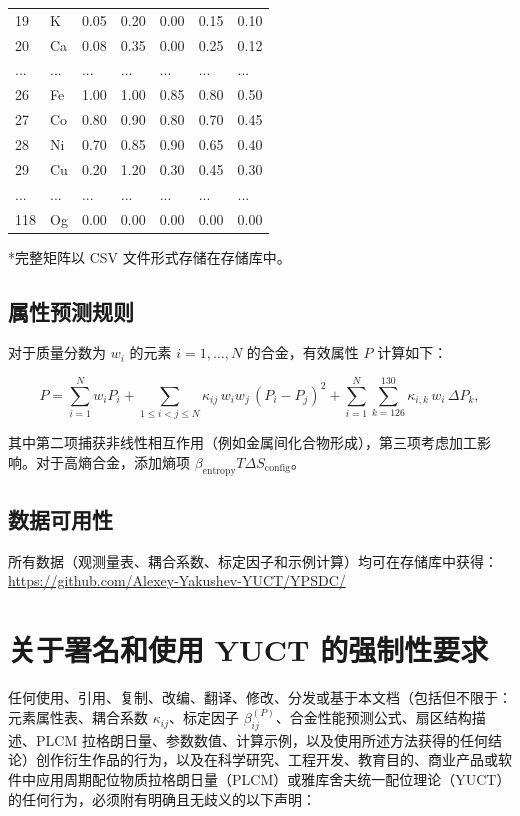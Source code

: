 \documentclass[12pt,a4paper]{article}
\begin{document}
\begin{longtable}{p{2.2cm}p{1.2cm}p{2.2cm}p{2.2cm}p{2.2cm}p{2.2cm}p{2.2cm}}
		19 & K   & 0.05 & 0.20 & 0.00 & 0.15 & 0.10 \\
		20 & Ca  & 0.08 & 0.35 & 0.00 & 0.25 & 0.12 \\
		... & ... & ... & ... & ... & ... & ... \\
		26 & Fe  & 1.00 & 1.00 & 0.85 & 0.80 & 0.50 \\
		27 & Co  & 0.80 & 0.90 & 0.80 & 0.70 & 0.45 \\
		28 & Ni  & 0.70 & 0.85 & 0.90 & 0.65 & 0.40 \\
		29 & Cu  & 0.20 & 1.20 & 0.30 & 0.45 & 0.30 \\
		... & ... & ... & ... & ... & ... & ... \\
		118& Og  & 0.00 & 0.00 & 0.00 & 0.00 & 0.00 \\
		\bottomrule
	\end{longtable}
	*完整矩阵以 CSV 文件形式存储在存储库中。
	
	\subsection{属性预测规则}
	
	对于质量分数为 \(w_i\) 的元素 \(i=1,\dots,N\) 的合金，有效属性 \(P\) 计算如下：
	
	\[
	P = \sum_{i=1}^{N} w_i P_i
	+ \sum_{1\le i<j\le N} \kappa_{ij}\, w_i w_j\, (P_i - P_j)^2
	+ \sum_{i=1}^{N} \sum_{k=126}^{130} \kappa_{i,k}\, w_i\, \Delta P_k,
	\]
	
	其中第二项捕获非线性相互作用（例如金属间化合物形成），第三项考虑加工影响。对于高熵合金，添加熵项 \(\beta_{\text{entropy}} T \Delta S_{\text{config}}\)。
	
	\subsection{数据可用性}
	
	所有数据（观测量表、耦合系数、标定因子和示例计算）均可在存储库中获得：
	\url{https://github.com/Alexey-Yakushev-YUCT/YPSDC/}
	
	
	\section*{关于署名和使用 YUCT 的强制性要求}
	
	任何使用、引用、复制、改编、翻译、修改、分发或基于本文档（包括但不限于：元素属性表、耦合系数 \(\kappa_{ij}\)、标定因子 \(\beta_{ij}^{(P)}\)、合金性能预测公式、扇区结构描述、PLCM 拉格朗日量、参数数值、计算示例，以及使用所述方法获得的任何结论）创作衍生作品的行为，以及在科学研究、工程开发、教育目的、商业产品或软件中应用周期配位物质拉格朗日量（PLCM）或雅库舍夫统一配位理论（YUCT）的任何行为，必须附有明确且无歧义的以下声明：
	
\end{document}
